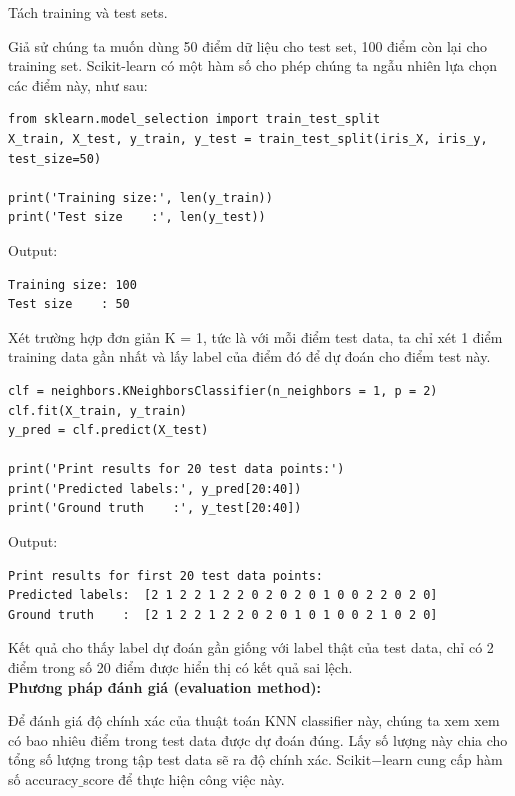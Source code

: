 \documentclass{article}
\begin{document}
Tách training và test sets.

Giả sử chúng ta muốn dùng 50 điểm dữ liệu cho test set, 100 điểm còn lại cho training set. Scikit-learn có một hàm số cho phép chúng ta ngẫu nhiên lựa chọn các điểm này, như sau:

\begin{lstlisting}
from sklearn.model_selection import train_test_split
X_train, X_test, y_train, y_test = train_test_split(iris_X, iris_y, test_size=50)

print('Training size:', len(y_train))
print('Test size    :', len(y_test))
\end{lstlisting}

Output:

\begin{lstlisting}
Training size: 100
Test size    : 50
\end{lstlisting}

Xét trường hợp đơn giản K = 1, tức là với mỗi điểm test data, ta chỉ xét 1 điểm training data gần nhất và lấy label của điểm đó để dự đoán cho điểm test này.

\begin{lstlisting}
clf = neighbors.KNeighborsClassifier(n_neighbors = 1, p = 2)
clf.fit(X_train, y_train)
y_pred = clf.predict(X_test)

print('Print results for 20 test data points:')
print('Predicted labels:', y_pred[20:40])
print('Ground truth    :', y_test[20:40])
\end{lstlisting}

Output:

\begin{lstlisting}
Print results for first 20 test data points:
Predicted labels:  [2 1 2 2 1 2 2 0 2 0 2 0 1 0 0 2 2 0 2 0]
Ground truth    :  [2 1 2 2 1 2 2 0 2 0 1 0 1 0 0 2 1 0 2 0]
\end{lstlisting}

Kết quả cho thấy label dự đoán gần giống với label thật của test data, chỉ có 2 điểm trong số 20 điểm được hiển thị có kết quả sai lệch.
\\

\textbf{Phương pháp đánh giá (evaluation method):}

Để đánh giá độ chính xác của thuật toán KNN classifier này, chúng ta xem xem có bao nhiêu điểm trong test data được dự đoán đúng. Lấy số lượng này chia cho tổng số lượng trong tập test data sẽ ra độ chính xác. Scikit$-$learn cung cấp hàm số accuracy$\_$score để thực hiện công việc này.
\end{document}
